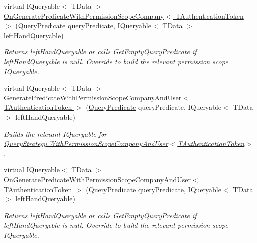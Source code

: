 \begin{DoxyCompactItemize}
virtual I\+Queryable$<$ T\+Data $>$ \hyperlink{classCqrs_1_1Repositories_1_1Queries_1_1QueryBuilder_a1f036fd121ef5181f846e6da72dddbad_a1f036fd121ef5181f846e6da72dddbad}{On\+Generate\+Predicate\+With\+Permission\+Scope\+Company$<$ T\+Authentication\+Token $>$} (\hyperlink{classCqrs_1_1Repositories_1_1Queries_1_1QueryPredicate}{Query\+Predicate} query\+Predicate, I\+Queryable$<$ T\+Data $>$ left\+Hand\+Queryable)
\begin{DoxyCompactList}\small\item\em Returns {\itshape left\+Hand\+Queryable}  or calls \hyperlink{classCqrs_1_1Repositories_1_1Queries_1_1QueryBuilder_a7dc8f0da3bb4ef54b8cbdda6c50ee0a1_a7dc8f0da3bb4ef54b8cbdda6c50ee0a1}{Get\+Empty\+Query\+Predicate} if {\itshape left\+Hand\+Queryable}  is null. Override to build the relevant permission scope I\+Queryable. \end{DoxyCompactList}\item 
virtual I\+Queryable$<$ T\+Data $>$ \hyperlink{classCqrs_1_1Repositories_1_1Queries_1_1QueryBuilder_a49c0626c4137be11afbb1e398294e474_a49c0626c4137be11afbb1e398294e474}{Generate\+Predicate\+With\+Permission\+Scope\+Company\+And\+User$<$ T\+Authentication\+Token $>$} (\hyperlink{classCqrs_1_1Repositories_1_1Queries_1_1QueryPredicate}{Query\+Predicate} query\+Predicate, I\+Queryable$<$ T\+Data $>$ left\+Hand\+Queryable)
\begin{DoxyCompactList}\small\item\em Builds the relevant I\+Queryable for \hyperlink{classCqrs_1_1Repositories_1_1Queries_1_1QueryStrategy_ac21d8e8a04e218e1a7c283ad181e0e9f_ac21d8e8a04e218e1a7c283ad181e0e9f}{Query\+Strategy.\+With\+Permission\+Scope\+Company\+And\+User$<$\+T\+Authentication\+Token$>$}. \end{DoxyCompactList}\item 
virtual I\+Queryable$<$ T\+Data $>$ \hyperlink{classCqrs_1_1Repositories_1_1Queries_1_1QueryBuilder_aded996242ae739440270f227ad777635_aded996242ae739440270f227ad777635}{On\+Generate\+Predicate\+With\+Permission\+Scope\+Company\+And\+User$<$ T\+Authentication\+Token $>$} (\hyperlink{classCqrs_1_1Repositories_1_1Queries_1_1QueryPredicate}{Query\+Predicate} query\+Predicate, I\+Queryable$<$ T\+Data $>$ left\+Hand\+Queryable)
\begin{DoxyCompactList}\small\item\em Returns {\itshape left\+Hand\+Queryable}  or calls \hyperlink{classCqrs_1_1Repositories_1_1Queries_1_1QueryBuilder_a7dc8f0da3bb4ef54b8cbdda6c50ee0a1_a7dc8f0da3bb4ef54b8cbdda6c50ee0a1}{Get\+Empty\+Query\+Predicate} if {\itshape left\+Hand\+Queryable}  is null. Override to build the relevant permission scope I\+Queryable. \end{DoxyCompactList}\item 

\end{DoxyCompactItemize}
